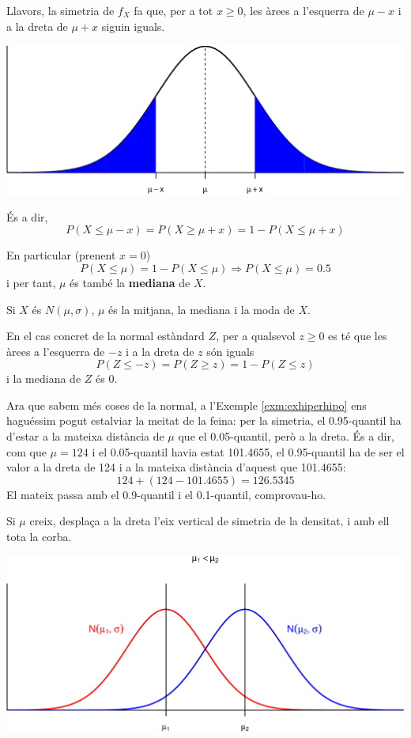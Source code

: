 \documentclass[
]{book}
\renewcommand{\leq}{\leqslant}
\renewcommand{\geq}{\geqslant}
\newenvironment{rmdblock}[1]
  {
  \begin{itemize}
  \renewcommand{\labelitemi}{
    \raisebox{-.7\height}[0pt][0pt]{
      {\setkeys{Gin}{width=3em,keepaspectratio}\texttt{[image: Bioestadística-II\_files/figure-html/\#1]}}
    }
  }
  \setlength{\fboxsep}{1em}
  \begin{kframe}
  \item
  }
  {
  \end{kframe}
  \end{itemize}
  }
\newenvironment{rmdnote}
  {\begin{rmdblock}{note}}
  {\end{rmdblock}}
\newenvironment{rmdimportant}
  {\begin{rmdblock}{important}}
  {\end{rmdblock}}
\theoremstyle{definition}
\theoremstyle{definition}
\theoremstyle{definition}
\theoremstyle{remark}
\begin{document}
Llavors, la simetria de \(f_X\) fa que, per a tot \(x\geq 0\), les àrees a l'esquerra de \(\mu-x\) i a la dreta de \(\mu+x\) siguin iguals.

\begin{center}\includegraphics[width=0.8\linewidth]{Bioestadistica-II_files/figure-latex/unnamed-chunk-97-1} \end{center}

És a dir,
\[
P(X\leq \mu-x)=P(X\geq \mu+x)=1-P(X\leq \mu+x)
\]

En particular (prenent \(x=0\))
\[
P(X\leq \mu)=1-P(X\leq \mu)\Rightarrow P(X\leq \mu)=0.5
\]
i per tant, \(\mu\) és també la \textbf{mediana} de \(X\).

\begin{rmdimportant}
Si \(X\) és \(N(\mu,\sigma)\), \(\mu\) és la mitjana, la mediana i la moda de \(X\).
\end{rmdimportant}

En el cas concret de la normal estàndard \(Z\), per a qualsevol \(z\geq 0\) es té que les àrees a l'esquerra de \(-z\) i a la dreta de \(z\) són iguals
\[
P(Z\leq -z)=P(Z\geq z)=1-P(Z\leq z)
\]
i la mediana de \(Z\) és 0.

\begin{rmdnote}
Ara que sabem més coses de la normal, a l'Exemple \ref{exm:exhiperhipo} ens haguéssim pogut estalviar la meitat de la feina: per la simetria, el 0.95-quantil ha d'estar a la mateixa distància de \(\mu\) que el 0.05-quantil, però a la dreta. És a dir, com que \(\mu=124\) i el 0.05-quantil havia estat 101.4655, el 0.95-quantil ha de ser el valor a la dreta de 124 i a la mateixa distància d'aquest que 101.4655:
\[
124+(124-101.4655)=126.5345
\]
El mateix passa amb el 0.9-quantil i el 0.1-quantil, comprovau-ho.
\end{rmdnote}

Si \(\mu\) creix, desplaça a la dreta l'eix vertical de simetria de la densitat, i amb ell tota la corba.

\begin{center}\includegraphics[width=0.8\linewidth]{Bioestadistica-II_files/figure-latex/unnamed-chunk-101-1} \end{center}
\end{document}

